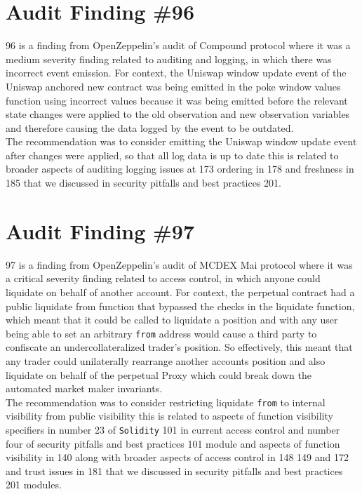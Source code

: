 \section{Audit Finding \#96}

96 is a finding from OpenZeppelin's audit of Compound protocol where it was a medium severity finding related to auditing and logging, in which there was incorrect event emission. For context, the Uniswap window update event of the Uniswap anchored new contract was being emitted in the poke window values function using incorrect values because it was being emitted before the relevant state changes were applied to the old observation and new observation variables and therefore causing the data logged by the event to be outdated.\\

The recommendation was to consider emitting the Uniswap window update event after changes were applied, so that all log data is up to date this is related to broader aspects of auditing logging issues at 173 ordering in 178 and freshness in 185 that we discussed in security pitfalls and best practices 201.

\section{Audit Finding \#97}

97 is a finding from OpenZeppelin's audit of MCDEX Mai protocol where it was a critical severity finding related to access control, in which anyone could liquidate on behalf of another account. For context, the perpetual contract had a public liquidate from function that bypassed the checks in the liquidate function, which meant that it could be called to liquidate a position and with any user being able to set an arbitrary \verb|from| address would cause a third party to confiscate an undercollateralized trader's position. So effectively, this meant that any trader could unilaterally rearrange another accounts position and also liquidate on behalf of the perpetual Proxy which could break down the automated market maker invariants.\\ 

The recommendation was to consider restricting liquidate \verb|from| to internal visibility from public visibility this is related to aspects of function visibility specifiers in number 23 of \verb|Solidity| 101 in current access control and number four of security pitfalls and best practices 101 module and aspects of function visibility in 140 along with broader aspects of access control in 148 149 and 172 and trust issues in 181 that we discussed in security pitfalls and best practices 201 modules.

